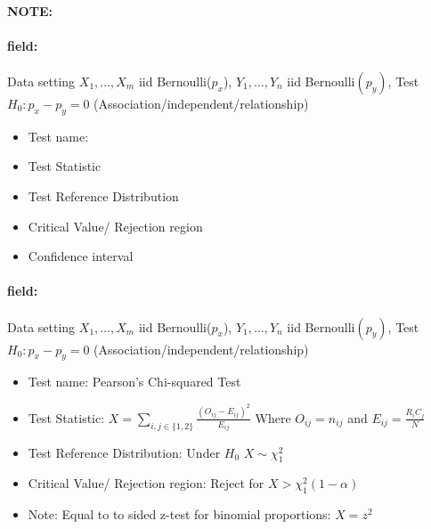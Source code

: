 \documentclass[12pt]{article}
\newenvironment{note}{\paragraph{NOTE:}}{}
\newenvironment{field}{\paragraph{field:}}{}
\begin{document}
\begin{note}
 \begin{field}
  Data setting $X_1, \ldots , X_m$ iid Bernoulli($p_x$), $Y_1, \ldots, Y_n$ iid Bernoulli$(p_y)$, Test $H_0: p_x - p_y = 0$ (Association/independent/relationship)
  \begin{itemize}
   \item Test name:
   \item Test Statistic
   \item Test Reference Distribution
   \item Critical Value/ Rejection region
   \item Confidence interval
  \end{itemize}
 \end{field}
 \begin{field}
  Data setting $X_1, \ldots , X_m$ iid Bernoulli($p_x$), $Y_1, \ldots, Y_n$ iid Bernoulli$(p_y)$, Test $H_0: p_x - p_y = 0$ (Association/independent/relationship)
  \begin{itemize}
   \item Test name: Pearson's Chi-squared Test
   \item Test Statistic: $X = \sum_{i,j \in \{1,2\}} \frac{(O_{ij} - E_{ij})^2}{E_{ij}}$ Where $O_{ij} = n_{ij}$ and $E_{ij} = \frac{R_iC_j}{N}$
   \item Test Reference Distribution: Under $H_0$ $X \sim \chi^2_1$
   \item Critical Value/ Rejection region: Reject for $X > \chi_1^2(1 - \alpha)$
   \item Note: Equal to to sided z-test for binomial proportions: $X = z^2$
  \end{itemize}
 \end{field}
\end{note}
\end{document}
